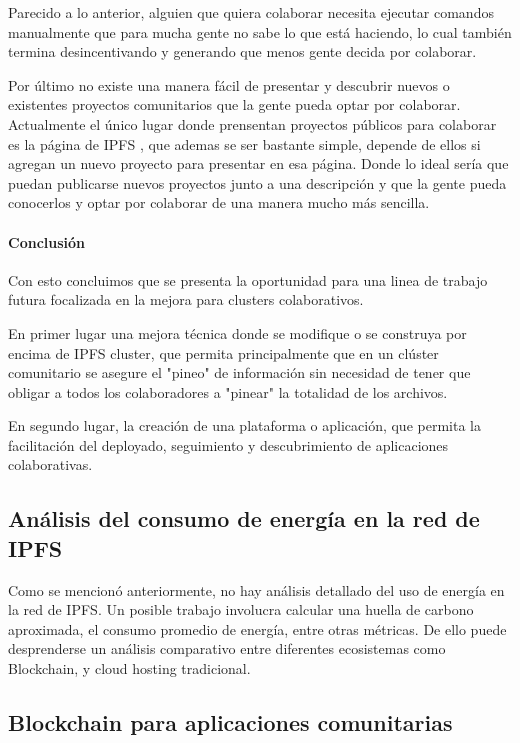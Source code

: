 Parecido a lo anterior, alguien que quiera colaborar necesita ejecutar comandos manualmente que para mucha gente no sabe lo que está haciendo, lo cual también termina desincentivando y generando que menos gente decida por colaborar.

Por último no existe una manera fácil de presentar y descubrir nuevos o existentes proyectos comunitarios que la gente pueda optar por colaborar. Actualmente el único lugar donde prensentan proyectos públicos para colaborar es la página de IPFS \cite{collaborative-clusters}, que ademas se ser bastante simple, depende de ellos si agregan un nuevo proyecto para presentar en esa página. Donde lo ideal sería que puedan publicarse nuevos proyectos junto a una descripción y que la gente pueda conocerlos y optar por colaborar de una manera mucho más sencilla.

\paragraph{Conclusión}

Con esto concluimos que se presenta la oportunidad para una linea de trabajo futura focalizada en la mejora para clusters colaborativos. 

En primer lugar una mejora técnica donde se modifique o se construya por encima de IPFS cluster, que permita principalmente que en un clúster comunitario se asegure el "pineo" de información sin necesidad de tener que obligar a todos los colaboradores a "pinear" la totalidad de los archivos.

En segundo lugar, la creación de una plataforma o aplicación, que permita la facilitación del deployado, seguimiento y descubrimiento de aplicaciones colaborativas.

\subsection{Análisis del consumo de energía en la red de IPFS}

Como se mencionó anteriormente, no hay análisis detallado del uso de energía en la red de IPFS. Un posible trabajo involucra calcular una huella de carbono aproximada, el consumo promedio de energía, entre otras métricas. De ello puede desprenderse un análisis comparativo entre diferentes ecosistemas como Blockchain, y cloud hosting tradicional.

\subsection{Blockchain para aplicaciones comunitarias}

